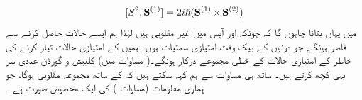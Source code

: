 \begin{align}\label{مساوات_تین_ابعادی_مربع_ایک_مقلوب}
[S^2 , \operatorname{\mathbf{S}}^{(1)}] = 2 i \hslash (\operatorname{\mathbf{S}}^{(1)} \times \operatorname{\mathbf{S}}^{(2)})
\end{align}
 میں یہاں بتانا چاہوں گا کہ چونکہ  اور  آپس میں  غیر مقلوبی ہیں لہٰذا ہم ایسے حالات حاصل کرنے سے قاصر ہونگے جو دونوں کے بیک وقت امتیازی سمتیات   ہوں۔ ہمیں  کے امتیازی حالات تیار کرنے کی خاطر  کے  امتیازی حالات کے خطی مجموعے درکار ہونگے۔(  مساوات    میں)  کلیبش  و گورڈن عددی سر  یہی کچھ کرتے ہیں۔ ساتھ ہی مساوات  سے ہم کہہ سکتے ہیں کہ  کے ساتھ
 مجموعہ  مقلوبی  ہوگا،  جو ہماری معلومات  (مساوات )   کی ایک مخصوص صورت ہے ۔


